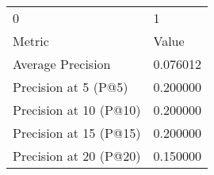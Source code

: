 \begin{tabular}{ll}
0 & 1 \\
Metric & Value \\
Average Precision & 0.076012 \\
Precision at 5 (P@5) & 0.200000 \\
Precision at 10 (P@10) & 0.200000 \\
Precision at 15 (P@15) & 0.200000 \\
Precision at 20 (P@20) & 0.150000 \\
\end{tabular}
